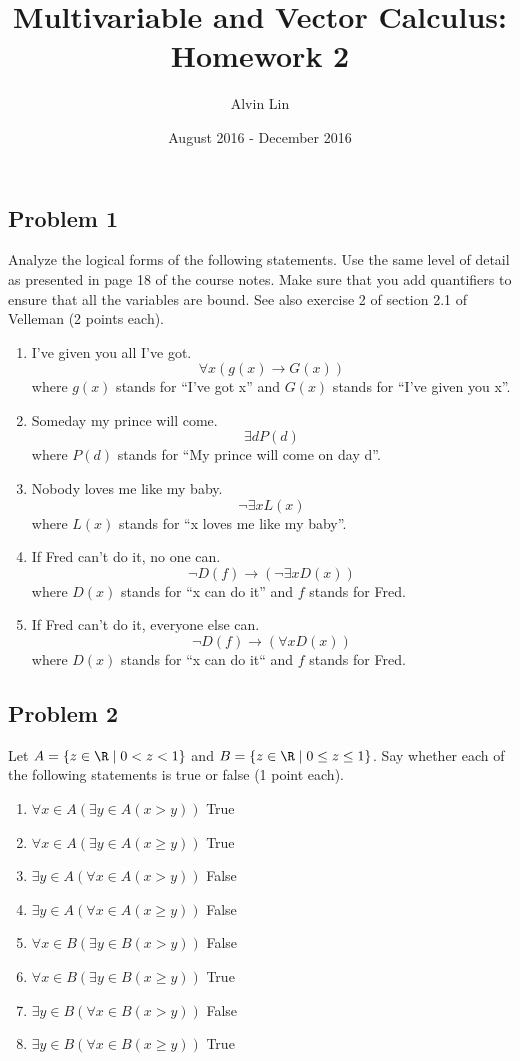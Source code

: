 \documentclass[letterpaper, 12pt]{math}
\title{Multivariable and Vector Calculus: Homework 2}
\author{Alvin Lin}
\date{August 2016 - December 2016}
\begin{document}
\maketitle

\subsection*{Problem 1}
Analyze the logical forms of the following statements. Use the same level of
detail as presented in page 18 of the course notes. Make sure that you add
quantifiers to ensure that all the variables are bound. See also exercise 2 of
section 2.1 of Velleman (2 points each).
\begin{enumerate}
  \item I've given you all I've got.
    \[ \forall{x}(g(x)\to G(x)) \]
    where \( g(x) \) stands for ``I've got x'' and \( G(x) \) stands for ``I've
    given you x''.
  \item Someday my prince will come.
    \[ \exists{d}P(d) \]
    where \( P(d) \) stands for ``My prince will come on day d''.
  \item Nobody loves me like my baby.
    \[ \neg\exists{x}L(x) \]
    where \( L(x) \) stands for ``x loves me like my baby''.
  \item If Fred can't do it, no one can.
    \[ \neg D(f)\to(\neg\exists{x}D(x)) \]
    where \( D(x) \) stands for ``x can do it'' and \( f \) stands for Fred.
  \item If Fred can't do it, everyone else can.
    \[ \neg D(f)\to(\forall{x}D(x)) \]
    where \( D(x) \) stands for ``x can do it`` and \( f \) stands for Fred.
\end{enumerate}

\subsection*{Problem 2}
Let \( A = \{z\in\R \mid 0 < z < 1\} \) and \( B = \{z\in\R \mid 0 \le z \le
1\} \). Say whether each of the following statements is true or false (1 point
each).
\begin{enumerate}
  \item \( \forall{x}\in A(\exists{y}\in A(x > y)) \) True
  \item \( \forall{x}\in A(\exists{y}\in A(x \ge y)) \) True
  \item \( \exists{y}\in A(\forall{x}\in A(x > y)) \) False
  \item \( \exists{y}\in A(\forall{x}\in A(x \ge y)) \) False
  \item \( \forall{x}\in B(\exists{y}\in B(x > y)) \) False
  \item \( \forall{x}\in B(\exists{y}\in B(x \ge y)) \) True
  \item \( \exists{y}\in B(\forall{x}\in B(x > y)) \) False
  \item \( \exists{y}\in B(\forall{x}\in B(x \ge y)) \) True
\end{enumerate}
\end{document}
